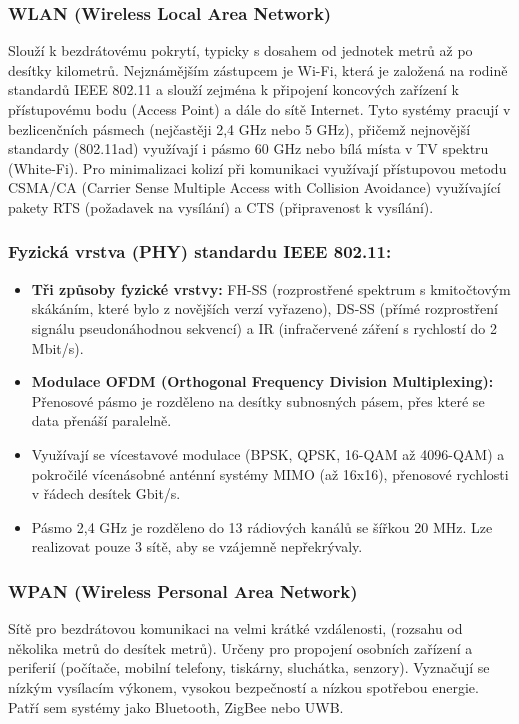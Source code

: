 		\subsubsection{WLAN (Wireless Local Area Network)}
		Slouží k bezdrátovému pokrytí, typicky s dosahem od jednotek metrů až po desítky kilometrů. Nejznámějším zástupcem je Wi-Fi, která je založená na rodině standardů IEEE 802.11 a slouží zejména k připojení koncových zařízení k přístupovému bodu (Access Point) a dále do sítě Internet. Tyto systémy pracují v bezlicenčních pásmech (nejčastěji 2,4 GHz nebo 5 GHz), přičemž nejnovější standardy (802.11ad) využívají i pásmo 60 GHz nebo bílá místa v TV spektru (White-Fi). Pro minimalizaci kolizí při komunikaci využívají přístupovou metodu CSMA/CA (Carrier Sense Multiple Access with Collision Avoidance) využívající pakety RTS (požadavek na vysílání) a CTS (připravenost k vysílání).
		\subsubsection*{Fyzická vrstva (PHY) standardu IEEE 802.11:}
			\begin{itemize}
				\item \textbf{Tři způsoby fyzické vrstvy:} FH-SS (rozprostřené spektrum s kmitočtovým skákáním, které bylo z novějších verzí vyřazeno), DS-SS (přímé rozprostření signálu pseudonáhodnou sekvencí) a IR (infračervené záření s rychlostí do 2 Mbit/s).
				\item \textbf{Modulace OFDM (Orthogonal Frequency Division Multiplexing):} Přenosové pásmo je rozděleno na desítky subnosných pásem, přes které se data přenáší paralelně.
				\item Využívají se vícestavové modulace (BPSK, QPSK, 16-QAM až 4096-QAM) a pokročilé vícenásobné anténní systémy MIMO (až 16x16), přenosové rychlosti v řádech desítek Gbit/s.
				\item Pásmo 2,4 GHz je rozděleno do 13 rádiových kanálů se šířkou 20 MHz. Lze realizovat pouze 3 sítě, aby se vzájemně nepřekrývaly.
			\end{itemize}
		\subsubsection{WPAN (Wireless Personal Area Network)}
		Sítě pro bezdrátovou komunikaci na velmi krátké vzdálenosti, (rozsahu od několika metrů do desítek metrů). Určeny pro propojení osobních zařízení a periferií (počítače, mobilní telefony, tiskárny, sluchátka, senzory). Vyznačují se nízkým vysílacím výkonem, vysokou bezpečností a nízkou spotřebou energie. Patří sem systémy jako Bluetooth, ZigBee nebo UWB.	
